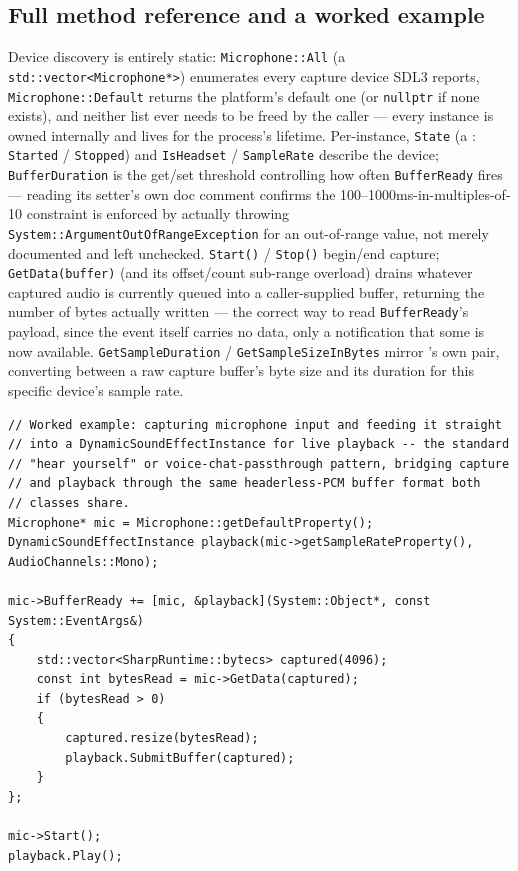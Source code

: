 \subsection{Full method reference and a worked example}

Device discovery is entirely static: \texttt{Microphone::All} (a
\texttt{std::vector<Microphone*>}) enumerates every capture device SDL3 reports,
\texttt{Microphone::Default} returns the platform's default one (or \texttt{nullptr} if none
exists), and neither list ever needs to be freed by the caller --- every 
instance is owned internally and lives for the process's lifetime. Per-instance,
\texttt{State} (a : \texttt{Started} / \texttt{Stopped}) and
\texttt{IsHeadset} / \texttt{SampleRate} describe the device; \texttt{BufferDuration} is the
get/set threshold controlling how often \texttt{BufferReady} fires --- reading its setter's own
doc comment confirms the 100--1000ms-in-multiples-of-10 constraint is enforced by actually
throwing \texttt{System::ArgumentOutOfRangeException} for an out-of-range value, not merely
documented and left unchecked. \texttt{Start()} / \texttt{Stop()} begin/end capture;
\texttt{GetData(buffer)} (and its offset/count sub-range overload) drains whatever captured
audio is currently queued into a caller-supplied buffer, returning the number of bytes
actually written --- the correct way to read \texttt{BufferReady}'s payload, since the event
itself carries no data, only a notification that some is now available.
\texttt{GetSampleDuration} / \texttt{GetSampleSizeInBytes} mirror 's own
pair, converting between a raw capture buffer's byte size and its duration for this specific
device's sample rate.

\begin{lstlisting}
// Worked example: capturing microphone input and feeding it straight
// into a DynamicSoundEffectInstance for live playback -- the standard
// "hear yourself" or voice-chat-passthrough pattern, bridging capture
// and playback through the same headerless-PCM buffer format both
// classes share.
Microphone* mic = Microphone::getDefaultProperty();
DynamicSoundEffectInstance playback(mic->getSampleRateProperty(), AudioChannels::Mono);

mic->BufferReady += [mic, &playback](System::Object*, const System::EventArgs&)
{
    std::vector<SharpRuntime::bytecs> captured(4096);
    const int bytesRead = mic->GetData(captured);
    if (bytesRead > 0)
    {
        captured.resize(bytesRead);
        playback.SubmitBuffer(captured);
    }
};

mic->Start();
playback.Play();
\end{lstlisting}
